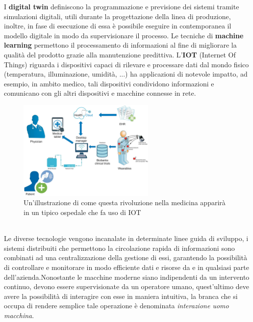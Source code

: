 \documentclass[10pt, letterpaper]{report}
\begin{document}
I \textbf{digital twin} definiscono la programmazione e previsione dei sistemi tramite simulazioni digitali, utili durante la 
progettazione della linea di produzione, inoltre, in fase di esecuzione di essa è possibile eseguire in contemporanea il modello 
digitale in modo da supervisionare il processo.\acc 
Le tecniche di \textbf{machine learning} permettono il processamento di informazioni al fine di migliorare la qualità del 
prodotto grazie alla manutenzione predittiva.\acc 
L'\textbf{IOT} (Internet Of Things) riguarda i dispositivi capaci di rilevare e processare dati 
dal mondo fisico (temperatura,
illuminazione, umidità, ...) ha applicazioni di notevole impatto, ad esempio, in ambito medico, tali dispositivi 
condividono informazioni e comunicano con gli altri dispositivi e macchine connesse in rete.\\\begin{figure}[h!]
    \centering
    \includegraphics[width=0.6\textwidth ]{images/iot.jpg}
    \caption{Un'illustrazione di come questa rivoluzione 
    nella medicina apparirà in un tipico ospedale che fa uso di IOT}
\end{figure}\\
Le diverse tecnologie vengono incanalate in determinate linee guida di sviluppo, i sistemi distribuiti che permettono 
la circolazione rapida di informazioni sono combinati ad una centralizzazione della gestione di essi, garantendo la possibilità 
di controllare e monitorare in modo efficiente dati e risorse da e in qualsiasi parte dell'azienda.\acc Nonostante le 
macchine moderne siano indipendenti da un intervento continuo, devono essere supervisionate da un operatore umano, 
quest'ultimo deve avere la possibilità di interagire  con esse in maniera intuitiva, la branca che si occupa di rendere 
semplice tale operazione è denominata \textit{interazione uomo macchina}.
\end{document}
